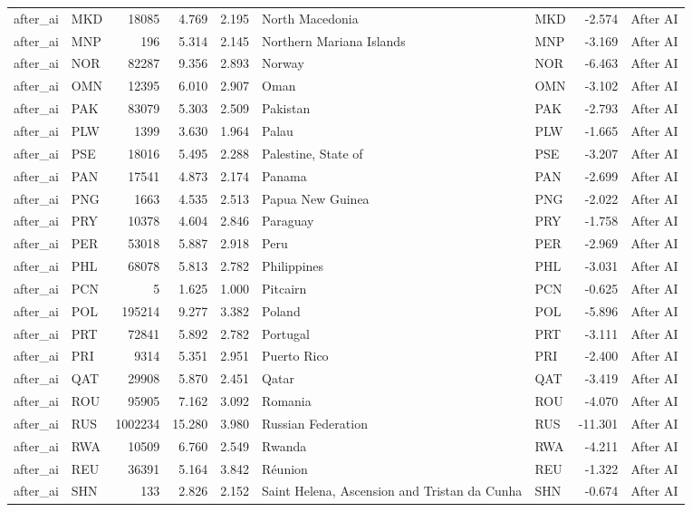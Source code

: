 \begin{tabular}{llrrrllrl}
after\_ai & MKD & 18085 & 4.769 & 2.195 & North Macedonia & MKD & -2.574 & After AI \\
after\_ai & MNP & 196 & 5.314 & 2.145 & Northern Mariana Islands & MNP & -3.169 & After AI \\
after\_ai & NOR & 82287 & 9.356 & 2.893 & Norway & NOR & -6.463 & After AI \\
after\_ai & OMN & 12395 & 6.010 & 2.907 & Oman & OMN & -3.102 & After AI \\
after\_ai & PAK & 83079 & 5.303 & 2.509 & Pakistan & PAK & -2.793 & After AI \\
after\_ai & PLW & 1399 & 3.630 & 1.964 & Palau & PLW & -1.665 & After AI \\
after\_ai & PSE & 18016 & 5.495 & 2.288 & Palestine, State of & PSE & -3.207 & After AI \\
after\_ai & PAN & 17541 & 4.873 & 2.174 & Panama & PAN & -2.699 & After AI \\
after\_ai & PNG & 1663 & 4.535 & 2.513 & Papua New Guinea & PNG & -2.022 & After AI \\
after\_ai & PRY & 10378 & 4.604 & 2.846 & Paraguay & PRY & -1.758 & After AI \\
after\_ai & PER & 53018 & 5.887 & 2.918 & Peru & PER & -2.969 & After AI \\
after\_ai & PHL & 68078 & 5.813 & 2.782 & Philippines & PHL & -3.031 & After AI \\
after\_ai & PCN & 5 & 1.625 & 1.000 & Pitcairn & PCN & -0.625 & After AI \\
after\_ai & POL & 195214 & 9.277 & 3.382 & Poland & POL & -5.896 & After AI \\
after\_ai & PRT & 72841 & 5.892 & 2.782 & Portugal & PRT & -3.111 & After AI \\
after\_ai & PRI & 9314 & 5.351 & 2.951 & Puerto Rico & PRI & -2.400 & After AI \\
after\_ai & QAT & 29908 & 5.870 & 2.451 & Qatar & QAT & -3.419 & After AI \\
after\_ai & ROU & 95905 & 7.162 & 3.092 & Romania & ROU & -4.070 & After AI \\
after\_ai & RUS & 1002234 & 15.280 & 3.980 & Russian Federation & RUS & -11.301 & After AI \\
after\_ai & RWA & 10509 & 6.760 & 2.549 & Rwanda & RWA & -4.211 & After AI \\
after\_ai & REU & 36391 & 5.164 & 3.842 & Réunion & REU & -1.322 & After AI \\
after\_ai & SHN & 133 & 2.826 & 2.152 & Saint Helena, Ascension and Tristan da Cunha & SHN & -0.674 & After AI \\

\end{tabular}
